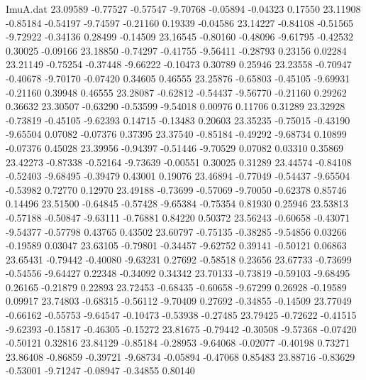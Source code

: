 \begin{filecontents}{ImuA.dat}
  23.09589   -0.77527   -0.57547   -9.70768   -0.05894   -0.04323    0.17550
  23.11908   -0.85184   -0.54197   -9.74597   -0.21160    0.19339   -0.04586
  23.14227   -0.84108   -0.51565   -9.72922   -0.34136    0.28499   -0.14509
  23.16545   -0.80160   -0.48096   -9.61795   -0.42532    0.30025   -0.09166
  23.18850   -0.74297   -0.41755   -9.56411   -0.28793    0.23156    0.02284
  23.21149   -0.75254   -0.37448   -9.66222   -0.10473    0.30789    0.25946
  23.23558   -0.70947   -0.40678   -9.70170   -0.07420    0.34605    0.46555
  23.25876   -0.65803   -0.45105   -9.69931   -0.21160    0.39948    0.46555
  23.28087   -0.62812   -0.54437   -9.56770   -0.21160    0.29262    0.36632
  23.30507   -0.63290   -0.53599   -9.54018    0.00976    0.11706    0.31289
  23.32928   -0.73819   -0.45105   -9.62393    0.14715   -0.13483    0.20603
  23.35235   -0.75015   -0.43190   -9.65504    0.07082   -0.07376    0.37395
  23.37540   -0.85184   -0.49292   -9.68734    0.10899   -0.07376    0.45028
  23.39956   -0.94397   -0.51446   -9.70529    0.07082    0.03310    0.35869
  23.42273   -0.87338   -0.52164   -9.73639   -0.00551    0.30025    0.31289
  23.44574   -0.84108   -0.52403   -9.68495   -0.39479    0.43001    0.19076
  23.46894   -0.77049   -0.54437   -9.65504   -0.53982    0.72770    0.12970
  23.49188   -0.73699   -0.57069   -9.70050   -0.62378    0.85746    0.14496
  23.51500   -0.64845   -0.57428   -9.65384   -0.75354    0.81930    0.25946
  23.53813   -0.57188   -0.50847   -9.63111   -0.76881    0.84220    0.50372
  23.56243   -0.60658   -0.43071   -9.54377   -0.57798    0.43765    0.43502
  23.60797   -0.75135   -0.38285   -9.54856    0.03266   -0.19589    0.03047
  23.63105   -0.79801   -0.34457   -9.62752    0.39141   -0.50121    0.06863
  23.65431   -0.79442   -0.40080   -9.63231    0.27692   -0.58518    0.23656
  23.67733   -0.73699   -0.54556   -9.64427    0.22348   -0.34092    0.34342
  23.70133   -0.73819   -0.59103   -9.68495    0.26165   -0.21879    0.22893
  23.72453   -0.68435   -0.60658   -9.67299    0.26928   -0.19589    0.09917
  23.74803   -0.68315   -0.56112   -9.70409    0.27692   -0.34855   -0.14509
  23.77049   -0.66162   -0.55753   -9.64547   -0.10473   -0.53938   -0.27485
  23.79425   -0.72622   -0.41515   -9.62393   -0.15817   -0.46305   -0.15272
  23.81675   -0.79442   -0.30508   -9.57368   -0.07420   -0.50121    0.32816
  23.84129   -0.85184   -0.28953   -9.64068   -0.02077   -0.40198    0.73271
  23.86408   -0.86859   -0.39721   -9.68734   -0.05894   -0.47068    0.85483
  23.88716   -0.83629   -0.53001   -9.71247   -0.08947   -0.34855    0.80140

\end{filecontents}

